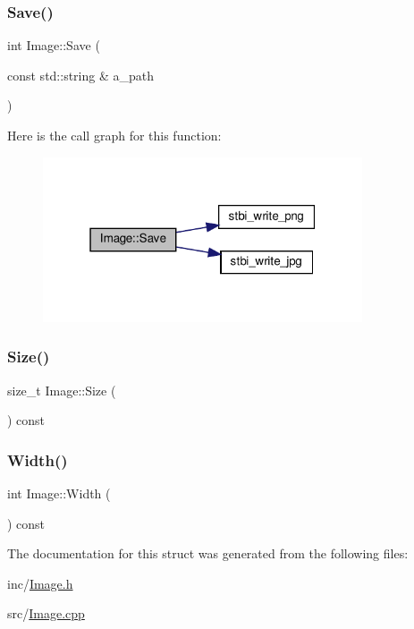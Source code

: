 \subsubsection{\texorpdfstring{Save()}{Save()}}
{\footnotesize\ttfamily int Image\+::\+Save (\begin{DoxyParamCaption}\item[{const std\+::string \&}]{a\+\_\+path }\end{DoxyParamCaption})}

Here is the call graph for this function\+:
\nopagebreak
\begin{figure}[H]
\begin{center}
\leavevmode
\includegraphics[width=268pt]{structImage_a4cb69c5911f1f8e4944047825dcf117c_cgraph}
\end{center}
\end{figure}
\mbox{\label{structImage_a3690a0986d16c2f5f30e2625e645cc8e}} 
\subsubsection{\texorpdfstring{Size()}{Size()}}
{\footnotesize\ttfamily size\+\_\+t Image\+::\+Size (\begin{DoxyParamCaption}{ }\end{DoxyParamCaption}) const\hspace{0.3cm}{\ttfamily [inline]}}

\mbox{\label{structImage_a191889676e394b6eba27e994edb7e02d}} 
\subsubsection{\texorpdfstring{Width()}{Width()}}
{\footnotesize\ttfamily int Image\+::\+Width (\begin{DoxyParamCaption}{ }\end{DoxyParamCaption}) const\hspace{0.3cm}{\ttfamily [inline]}}



The documentation for this struct was generated from the following files\+:\begin{DoxyCompactItemize}
\item 
inc/\hyperlink{Image_8h}{Image.\+h}\item 
src/\hyperlink{Image_8cpp}{Image.\+cpp}\end{DoxyCompactItemize}
